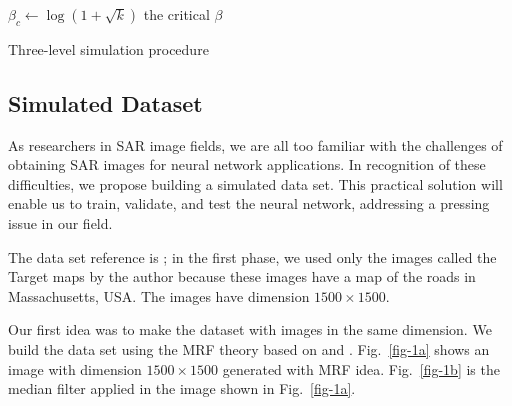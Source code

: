 \documentclass[
  journal,
]{IEEEtran}%
\begin{document}
\begin{algorithm}[hbt]
\SetAlgoLined
{}
$\beta_c \leftarrow \log(1+\sqrt{k})$ the critical $\beta$\;
\caption{Three-level simulation procedure}
\end{algorithm}

\subsection{Simulated Dataset}\label{simulated-dataset}

As researchers in SAR image fields, we are all too familiar with the
challenges of obtaining SAR images for neural network applications. In
recognition of these difficulties, we propose building a simulated data
set. This practical solution will enable us to train, validate, and test
the neural network, addressing a pressing issue in our field.

The data set reference is ; in the
first phase, we used only the images called the Target maps by the
author because these images have a map of the roads in Massachusetts,
USA. The images have dimension \(1500 \times 1500\).

Our first idea was to make the dataset with images in the same
dimension. We build the data set using the MRF theory based on
 and
. Fig.~\ref{fig-1a} shows an
image with dimension \(1500 \times 1500\) generated with MRF idea.
Fig.~\ref{fig-1b} is the median filter applied in the image shown in
Fig.~\ref{fig-1a}.
\end{document}
